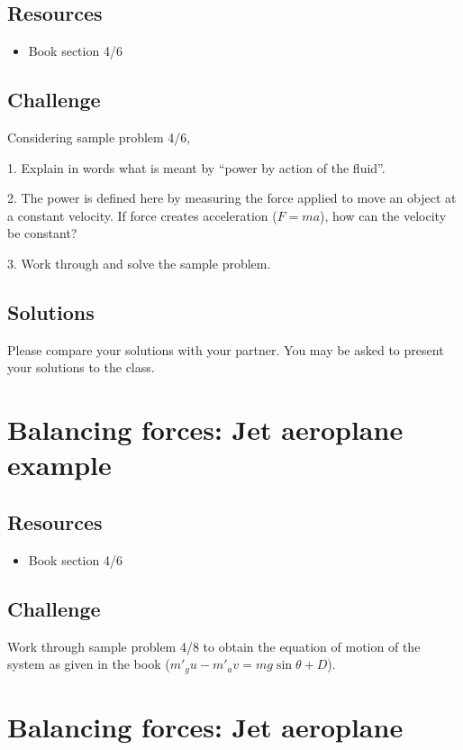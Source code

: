 \subsection*{Resources}
\begin{itemize}
    \item Book section 4/6
\end{itemize}

\subsection*{Challenge}
Considering sample problem 4/6,

1. Explain in words what is meant by ``power by action of the fluid''.

2. The power is defined here by measuring the force applied to move an object at a constant velocity. If force creates acceleration ($F=ma$), how can the velocity be constant?

3. Work through and solve the sample problem.

\subsection*{Solutions}
Please compare your solutions with your partner. You may be asked to present your solutions to the class.




\newpage
\section{Balancing forces: Jet aeroplane example}

\subsection*{Resources}
\begin{itemize}
    \item Book section 4/6
\end{itemize}

\subsection*{Challenge}
Work through sample problem 4/8 to obtain the equation of motion of the system as given in the book ($m'_gu-m'_av=mg\sin{\theta}+D$).




\newpage
\section{Balancing forces: Jet aeroplane}

